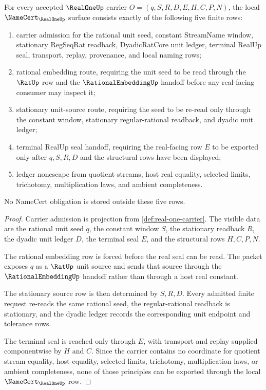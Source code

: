 \begin{theorem}
\label{thm:real-one-namecert-obligations}
For every accepted $\RealOneUp$ carrier $O=(q,S,R,D,E,H,C,P,N)$, the local $\NameCert_{\RealOneUp}$ surface consists exactly of the following five finite rows:
\begin{enumerate}
\item carrier admission for the rational unit seed, constant StreamName window, stationary RegSeqRat readback, DyadicRatCore unit ledger, terminal RealUp seal, transport, replay, provenance, and local naming rows;
\item rational embedding route, requiring the unit seed to be read through the $\RatUp$ row and the $\RationalEmbeddingUp$ handoff before any real-facing consumer may inspect it;
\item stationary unit-source route, requiring the seed to be re-read only through the constant window, stationary regular-rational readback, and dyadic unit ledger;
\item terminal RealUp seal handoff, requiring the real-facing row $E$ to be exported only after $q,S,R,D$ and the structural rows have been displayed;
\item ledger nonescape from quotient streams, host real equality, selected limits, trichotomy, multiplication laws, and ambient completeness.
\end{enumerate}
No NameCert obligation is stored outside these five rows.
\end{theorem}
\begin{proof}
Carrier admission is projection from \autoref{def:real-one-carrier}. The visible data are the rational unit seed $q$, the constant window $S$, the stationary readback $R$, the dyadic unit ledger $D$, the terminal seal $E$, and the structural rows $H,C,P,N$.

The rational embedding row is forced before the real seal can be read. The packet exposes $q$ as a $\RatUp$ unit source and sends that source through the $\RationalEmbeddingUp$ handoff rather than through a host real constant.

The stationary source row is then determined by $S,R,D$. Every admitted finite request re-reads the same rational seed, the regular-rational readback is stationary, and the dyadic ledger records the corresponding unit endpoint and tolerance rows.

The terminal seal is reached only through $E$, with transport and replay supplied componentwise by $H$ and $C$. Since the carrier contains no coordinate for quotient stream equality, host equality, selected limits, trichotomy, multiplication laws, or ambient completeness, none of those principles can be exported through the local $\NameCert_{\RealOneUp}$ row.
\end{proof}

